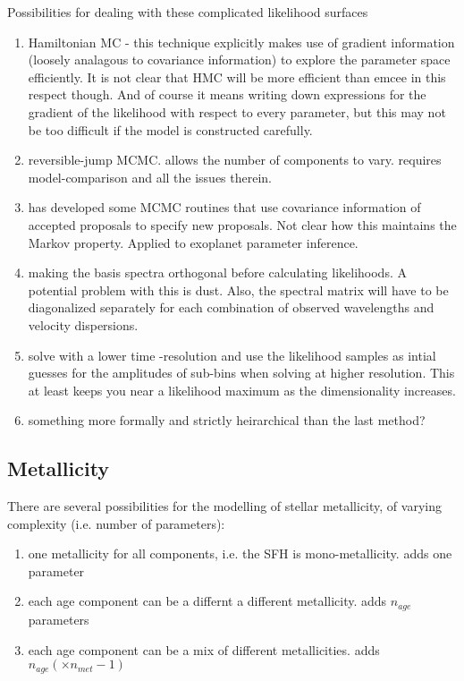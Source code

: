Possibilities for dealing with these complicated likelihood surfaces 
\begin{enumerate}

\item Hamiltonian MC - this technique explicitly makes use of gradient information (loosely analagous to covariance information) to explore the parameter space efficiently.  It is not clear that HMC will be more efficient than emcee in this respect though.  And of course it means writing down expressions for the gradient of the likelihood with respect to every parameter, but this may not be too difficult if the model is constructed carefully.

\item reversible-jump MCMC.  allows the number of components to vary.  requires model-comparison and all the issues therein.  

\item \citet{gregory11} has developed some MCMC routines that use covariance information of accepted proposals to specify new proposals.  Not clear how this maintains the Markov property.  Applied to exoplanet parameter inference.

\item making the basis spectra orthogonal before calculating likelihoods.  A potential problem with this is dust.  Also, the spectral matrix will have to be diagonalized separately for each combination of observed wavelengths and velocity dispersions.

\item solve with a lower time -resolution and use the likelihood samples as intial guesses for the amplitudes of sub-bins when solving at higher resolution.  This at least keeps you near a likelihood maximum as the dimensionality increases.

\item something more formally and strictly heirarchical than the last method?

\end{enumerate}

\subsection{Metallicity}
There are several possibilities for the modelling of stellar metallicity, of varying complexity (i.e. number of parameters):
\begin{enumerate}

\item one metallicity for all components, i.e. the SFH is mono-metallicity.  adds one parameter

\item each age component can be a differnt a different metallicity.  adds $n_{age}$ parameters

\item each age component can be a mix of different metallicities.  adds $n_{age} (\times n_{met} -1)$

\end{enumerate}

